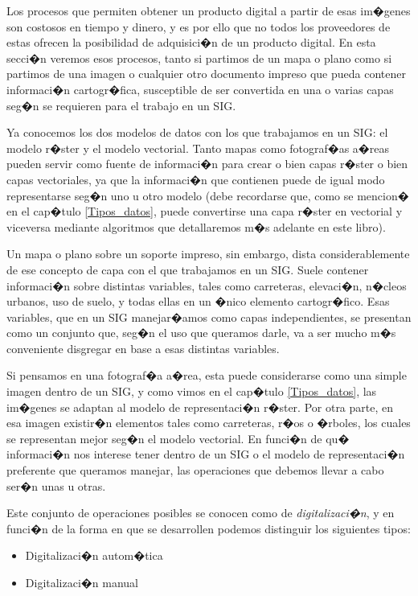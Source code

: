 Los procesos que permiten obtener un producto digital a partir de esas im�genes son costosos en tiempo y dinero, y es por ello que no todos los proveedores de estas ofrecen la posibilidad de adquisici�n de un producto digital. En esta secci�n veremos esos procesos, tanto si partimos de un mapa o plano como si partimos de una imagen o cualquier otro documento impreso que pueda contener informaci�n cartogr�fica, susceptible de ser convertida en una o varias capas seg�n se requieren para el trabajo en un SIG.

Ya conocemos los dos modelos de datos con los que trabajamos en un SIG: el modelo r�ster y el modelo vectorial. Tanto mapas como fotograf�as a�reas pueden servir como fuente de informaci�n para crear o bien capas r�ster o bien capas vectoriales, ya que la informaci�n que contienen puede de igual modo representarse seg�n uno u otro modelo (debe recordarse que, como se mencion� en el cap�tulo \ref{Tipos_datos}, puede convertirse una capa r�ster en vectorial y viceversa mediante algoritmos que detallaremos m�s adelante en este libro).

Un mapa o plano sobre un soporte impreso, sin embargo, dista considerablemente de ese concepto de capa con el que trabajamos en un SIG. Suele contener informaci�n sobre distintas variables, tales como carreteras, elevaci�n, n�cleos urbanos, uso de suelo, y todas ellas en un �nico elemento cartogr�fico. Esas variables, que en un SIG manejar�amos como capas independientes, se presentan como un conjunto que, seg�n el uso que queramos darle, va a ser mucho m�s conveniente disgregar en base a esas distintas variables.

Si pensamos en una fotograf�a a�rea, esta puede considerarse como una simple imagen dentro de un SIG, y como vimos en el cap�tulo \ref{Tipos_datos}, las im�genes se adaptan al modelo de representaci�n r�ster. Por otra parte, en esa imagen existir�n elementos tales como carreteras, r�os o �rboles, los cuales se representan mejor seg�n el modelo vectorial. En funci�n de qu� informaci�n nos interese tener dentro de un SIG o el modelo de representaci�n preferente que queramos manejar, las operaciones que debemos llevar a cabo ser�n unas u otras.

Este conjunto de operaciones posibles se conocen como de \emph{digitalizaci�n}, y en funci�n de la forma en que se desarrollen podemos distinguir los siguientes tipos:

\begin{itemize}
	\item Digitalizaci�n autom�tica 
	\item Digitalizaci�n manual
\end{itemize}

